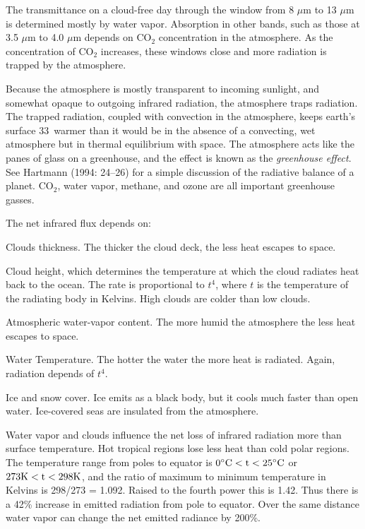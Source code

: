 The transmittance on a cloud-free day through the window from 8 $\mu$m to 13
$\mu$m is determined mostly by water vapor. Absorption in other bands, such as
those at 3.5
$\mu$m to 4.0 $\mu$m depends on CO$_2$ concentration in the atmosphere. As the
concentration of CO$_2$ increases, these windows close and more radiation is
trapped by the atmosphere.

Because the atmosphere is mostly transparent to incoming sunlight, and somewhat opaque to outgoing infrared radiation, the atmosphere traps radiation. The trapped radiation, coupled with convection in the atmosphere, keeps earth's surface 33\degrees\ warmer than it would be in the absence of a convecting, wet atmosphere but in thermal equilibrium with space. The atmosphere acts like the panes of glass on a greenhouse, and the effect is known as the \textit{greenhouse effect}. See Hartmann (1994: 24--26) for a simple discussion of the radiative balance of a planet. CO$_2$, water vapor, methane, and ozone are all important greenhouse gasses.

The net infrared flux depends on:
\begin{enumerate}
\vitem Clouds thickness. The thicker the cloud deck, the less heat escapes to
space.

\vitem Cloud height, which determines the temperature at which the
cloud radiates heat back to the ocean. The rate is proportional to $t^4$, where
$t$ is the temperature of the radiating body in Kelvins. High clouds are colder
than low clouds.

\vitem Atmospheric water-vapor content. The more humid the atmosphere the less
heat escapes to space.

\vitem Water Temperature. The hotter the water the more heat is radiated.
Again, radiation depends of $t^4$.

\vitem Ice and snow cover. Ice emits as a black body, but it cools much faster
than open water. Ice-covered seas are insulated from the atmosphere.
\end{enumerate}

Water vapor and clouds influence the net loss of infrared radiation more than
surface temperature. Hot tropical regions lose less heat than cold polar regions. The
temperature range from poles to equator is
$0^{\circ}\rm{C} < t < 25^{\circ}\rm{C}$ or
$273\rm{K} < t < 298\rm{K}$, and the ratio of maximum to minimum temperature in
Kelvins is 298/273 = 1.092. Raised to the fourth power this is 1.42. Thus
there is a 42\% increase in emitted radiation from pole to equator. Over the same
distance water vapor can change the net emitted radiance by 200\%.

